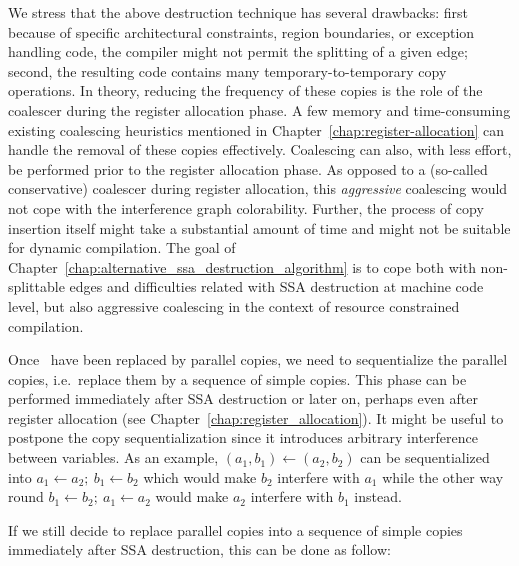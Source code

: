 We stress that the above destruction technique has several drawbacks: first because of specific architectural constraints, region boundaries, or exception handling code, the compiler might not permit the splitting of a given edge; second, the resulting code contains many temporary-to-temporary copy operations. In theory, reducing the frequency of these copies is the role of the coalescer during the register allocation phase. A few memory and time-consuming existing coalescing heuristics mentioned in Chapter~\ref{chap:register-allocation} can handle the removal of these copies effectively. Coalescing can also, with less effort, be performed prior to the register allocation phase. As opposed to a (so-called conservative) coalescer during register allocation, this \emph{aggressive} coalescing would not cope with the interference graph colorability. Further, the process of copy insertion itself might take a substantial amount of time and might not be suitable for dynamic compilation. The goal of Chapter~\ref{chap:alternative_ssa_destruction_algorithm} is to cope both with non-splittable edges and difficulties related with SSA destruction at machine code level, but also aggressive coalescing in the context of resource constrained compilation.

Once \phifuns\ have been replaced by parallel copies, we need to sequentialize the parallel copies, i.e.\ replace them by a sequence of simple copies. This phase can be performed immediately after SSA destruction or later on, perhaps even after register allocation (see Chapter~\ref{chap:register_allocation}). It might be useful to postpone the copy sequentialization since it introduces arbitrary interference between variables. As an example, $(a_1,b_1)\gets (a_2,b_2)$ can be sequentialized into $a_1\gets a_2;\ b_1\gets b_2$ which would make $b_2$ interfere with $a_1$ while the other way round $b_1\gets b_2;\ a_1\gets a_2$ would make $a_2$ interfere with $b_1$ instead.

If we still decide to replace parallel copies into a sequence of simple copies immediately after SSA destruction, this can be done as follow:

\begin{algorithm}
\end{algorithm}

